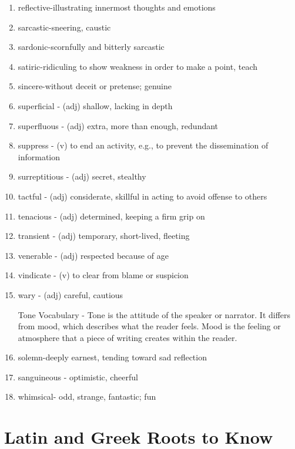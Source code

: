 \begin{enumerate}
\bigskip
\item reflective-illustrating innermost thoughts and emotions
\item sarcastic-sneering, caustic
\item sardonic-scornfully and bitterly sarcastic
\item satiric-ridiculing to show weakness in order to make a point, teach
\item sincere-without deceit or pretense; genuine
 
\bigskip
\item superficial - (adj) shallow, lacking in depth
\item superfluous - (adj) extra, more than enough, redundant
\item suppress - (v) to end an activity, e.g., to prevent the dissemination of information
\item surreptitious - (adj) secret, stealthy
\item tactful - (adj) considerate, skillful in acting to avoid offense to others
\item tenacious - (adj) determined, keeping a firm grip on
\item transient - (adj) temporary, short-lived, fleeting
\item venerable - (adj) respected because of age
\item vindicate - (v) to clear from blame or suspicion
\item wary - (adj) careful, cautious

\bigskip
Tone Vocabulary - Tone is the attitude of the speaker or narrator.  It differs from mood, which describes what the reader feels.  Mood is the feeling or atmosphere that a piece of writing creates within the reader.  

\bigskip
\item solemn-deeply earnest, tending toward sad reflection
\item sanguineous - optimistic, cheerful
\item whimsical- odd, strange, fantastic; fun
\end{enumerate}

\section{Latin and Greek Roots to Know}

